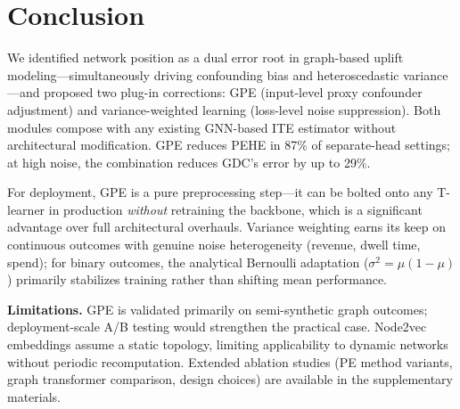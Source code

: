 \documentclass[sigconf,anonymous,review]{acmart}
\begin{document}
\section{Conclusion}\label{sec:conclusion}

We identified network position as a dual error root in graph-based uplift modeling---simultaneously driving confounding bias and heteroscedastic variance---and proposed two plug-in corrections: GPE (input-level proxy confounder adjustment) and variance-weighted learning (loss-level noise suppression). Both modules compose with any existing GNN-based ITE estimator without architectural modification. GPE reduces PEHE in 87\% of separate-head settings; at high noise, the combination reduces GDC's error by up to 29\%.

For deployment, GPE is a pure preprocessing step---it can be bolted onto any T-learner in production \emph{without} retraining the backbone, which is a significant advantage over full architectural overhauls. Variance weighting earns its keep on continuous outcomes with genuine noise heterogeneity (revenue, dwell time, spend); for binary outcomes, the analytical Bernoulli adaptation ($\sigma^2 = \mu(1-\mu)$) primarily stabilizes training rather than shifting mean performance.

\textbf{Limitations.} GPE is validated primarily on semi-synthetic graph outcomes; deployment-scale A/B testing would strengthen the practical case. Node2vec embeddings assume a static topology, limiting applicability to dynamic networks without periodic recomputation. Extended ablation studies (PE method variants, graph transformer comparison, design choices) are available in the supplementary materials.



\end{document}
